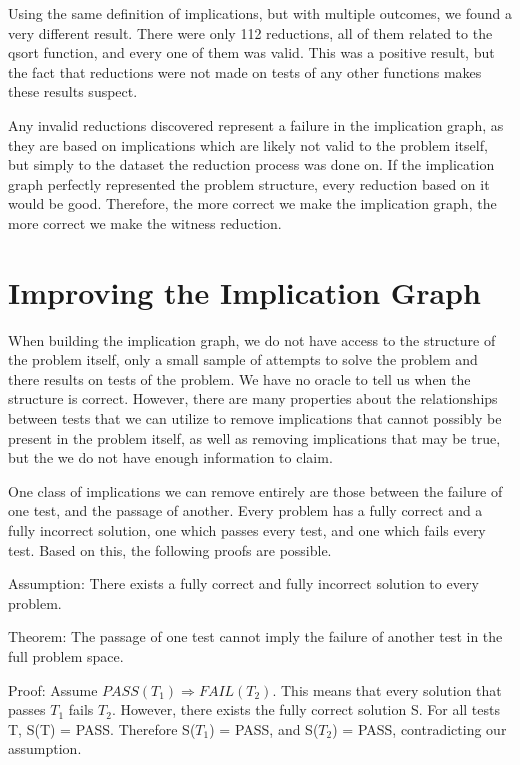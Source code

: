 \documentclass[11pt]{article}
\begin{document}
Using the same definition of implications, but with multiple outcomes, we found a very different result. There were only 112 reductions, all of them related to the qsort function, and every one of them was valid. This was a positive result, but the fact that reductions were not made on tests of any other functions makes these results suspect.

Any invalid reductions discovered represent a failure in the implication graph, as they are based on implications which are likely not valid to the problem itself, but simply to the dataset the reduction process was done on. If the implication graph perfectly represented the problem structure, every reduction based on it would be good. Therefore, the more correct we make the implication graph, the more correct we make the witness reduction.



\section{Improving the Implication Graph}



When building the implication graph, we do not have access to the structure of the problem itself, only a small sample of attempts to solve the problem and there results on tests of the problem. We have no oracle to tell us when the structure is correct. However, there are many properties about the relationships between tests that we can utilize to remove implications that cannot possibly be present in the problem itself, as well as removing implications that may be true, but the we do not have enough information  to claim.

One class of implications we can remove entirely are those between the failure of one test, and the passage of another. Every problem has a fully correct and a fully incorrect solution, one which passes every test, and one which fails every test. Based on this, the following proofs are possible.


Assumption: There exists a fully correct and fully incorrect solution to every problem.

Theorem: The passage of one test cannot imply the failure of another test in the full problem space.

Proof: Assume $PASS(T_1) \Rightarrow FAIL(T_2)$. This means that every solution that passes $T_1$ fails $T_2$. However, there exists the fully correct solution S. For all tests T, S(T) = PASS. Therefore S($T_1$) = PASS, and S($T_2$) = PASS, contradicting our assumption.
\end{document}
